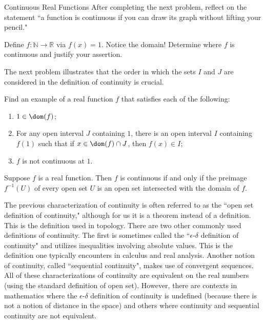 \begin{section}{Continuous Real Functions}
After completing the next problem, reflect on the statement ``a function is continuous if you can draw its graph without lifting your pencil."

\begin{problem}
Define $f:\mathbb{N}\to\mathbb{R}$ via $f(x)=1$. Notice the domain! Determine where $f$ is continuous and justify your assertion.
\end{problem}

The next problem illustrates that the order in which the sets $I$ and $J$ are considered in the definition of continuity is crucial.

\begin{problem}
Find an example of a real function $f$ that satisfies each of the following:
\begin{enumerate}[label=\textrm{(\roman*)}]
\item $1\in\dom(f)$;
\item For any open interval $J$ containing $1$, there is an open interval $I$ containing $f(1)$ such that if $x\in \dom(f)\cap J$, then $f(x)\in I$;
\item $f$ is not continuous at $1$.
\end{enumerate}
\end{problem}

\begin{theorem}\label{thm:inverse images open sets}
Suppose $f$ is a real function. Then $f$ is continuous if and only if the preimage $f^{-1}(U)$ of every open set $U$ is an open set intersected with the domain of $f$.
\end{theorem}

The previous characterization of continuity is often referred to as the ``open set definition of continuity," although for us it is a theorem instead of a definition. This is the definition used in topology. There are two other commonly used definitions of continuity. The first is sometimes called the ``$\epsilon$-$\delta$ definition of continuity" and utilizes inequalities involving absolute values. This is the definition one typically encounters in calculus and real analysis. Another notion of continuity, called ``sequential continuity", makes use of convergent sequences.  All of these characterizations of continuity are equivalent on the real numbers (using the standard definition of open set). However, there are contexts in mathematics where the $\epsilon$-$\delta$ definition of continuity is undefined (because there is not a notion of distance in the space) and others where continuity and sequential continuity are not equivalent.


\end{section}
